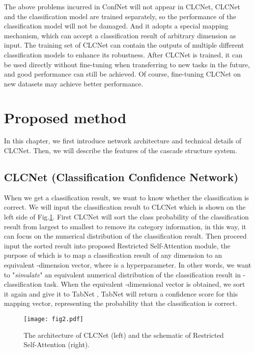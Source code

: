 \documentclass{article}
\begin{document}
The above problems incurred in ConfNet \cite{wan2018confnet} will not appear in CLCNet, CLCNet and the classification model are trained separately, so the performance of the classification model will not be damaged. And it adopts a special mapping mechanism, which can accept a classification result of arbitrary dimension as input. The training set of CLCNet can contain the outputs of multiple different classification models to enhance its robustness. After CLCNet is trained, it can be used directly without fine-tuning when transferring to new tasks in the future, and good performance can still be achieved. Of course, fine-tuning CLCNet on new datasets may achieve better performance.


\section{Proposed method}
\label{Proposed_method}
In this chapter, we first introduce network architecture and technical details of CLCNet. Then, we will describe the features of the cascade structure system.
\subsection{CLCNet (Classification Confidence Network)}
When we get a classification result, we want to know whether the classification is correct. We will input the classification result to CLCNet which is shown on the left side of Fig.\ref{fig2}. First CLCNet will sort the class probability of the classification result from largest to smallest to remove its category information, in this way, it can focus on the numerical distribution of the classification result. Then proceed input the sorted result into proposed Restricted Self-Attention module, the purpose of which is to map a classification result of any dimension to an equivalent -dimension vector, where  is a hyperparameter. In other words, we want to "\emph{simulate}" an equivalent numerical distribution of the classification result in -classification task. When the equivalent -dimensional vector is obtained, we sort it again and give it to TabNet \cite{arik2021tabnet}, TabNet will return a confidence score for this mapping vector, representing the probability that the classification is correct.


\begin{figure}
  \vspace{-0em}  
  \centering
  \texttt{[image: fig2.pdf]}
  \caption{The architecture of CLCNet (left) and the schematic of Restricted Self-Attention (right).}
  \label{fig2}
  \vspace{-0em}  \end{figure}
\end{document}
